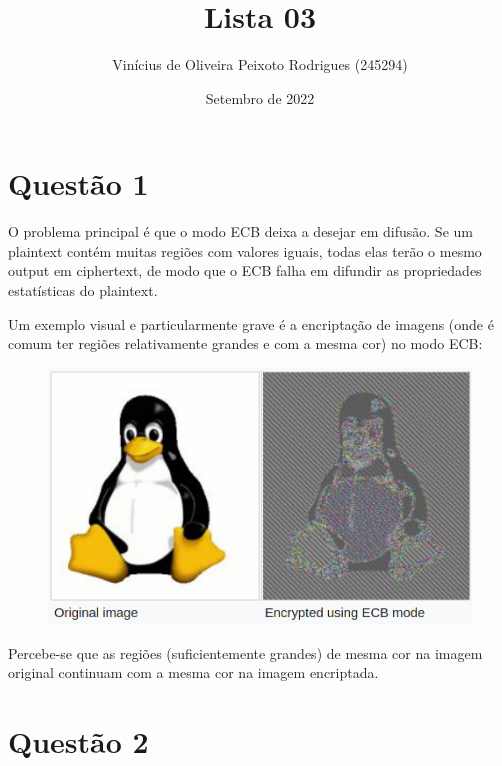 \documentclass{article}
\title{Lista 03}
\author{Vinícius de Oliveira Peixoto Rodrigues (245294)}
\date{Setembro de 2022}
\begin{document}
\maketitle

\section*{Questão 1}

O problema principal é que o modo ECB deixa a desejar em difusão. Se um plaintext contém muitas regiões com valores iguais, todas elas terão o mesmo output em ciphertext, de modo que o ECB falha em difundir as propriedades estatísticas do plaintext.

Um exemplo visual e particularmente grave é a encriptação de imagens (onde é comum ter regiões relativamente grandes e com a mesma cor) no modo ECB:

\FloatBarrier
\begin{figure}[!ht]
    \begin{center}
        \includegraphics[width=\textwidth]{images/ecb_image.png}
    \end{center}
\end{figure} 

Percebe-se que as regiões (suficientemente grandes) de mesma cor na imagem original continuam com a mesma cor na imagem encriptada.

\newpage
\section*{Questão 2}
\end{document}

